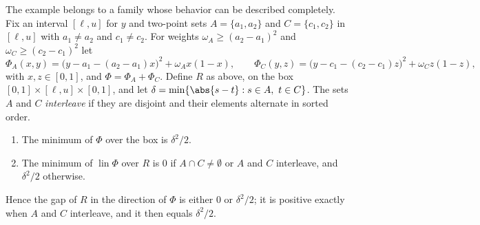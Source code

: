 The example belongs to a family whose behavior can be described
completely. Fix an interval $[\ell,u]$ for $y$ and two-point sets
$A=\{a_1,a_2\}$ and $C=\{c_1,c_2\}$ in $[\ell,u]$ with $a_1\ne a_2$ and
$c_1\ne c_2$. For weights $\omega_A\ge(a_2-a_1)^2$ and
$\omega_C\ge(c_2-c_1)^2$ let
\begin{equation}\label{eq:family}
\Phi_A(x,y)=\bigl(y-a_1-(a_2-a_1)x\bigr)^2+\omega_Ax(1-x),\qquad
\Phi_C(y,z)=\bigl(y-c_1-(c_2-c_1)z\bigr)^2+\omega_Cz(1-z),
\end{equation}
with $x,z\in[0,1]$, and $\Phi=\Phi_A+\Phi_C$. Define $R$ as above, on the
box $[0,1]\times[\ell,u]\times[0,1]$, and let
$\delta=\min\{\abs{s-t}:s\in A,\ t\in C\}$. The sets $A$ and $C$
\emph{interleave} if they are disjoint and their elements alternate in
sorted order.

\begin{theorem}[Interleaving]\label{thm:interleave}
\begin{enumerate}[label=(\roman*)]
\item The minimum of $\Phi$ over the box is $\delta^2/2$.
\item The minimum of $\operatorname{lin}\Phi$ over $R$ is $0$ if
$A\cap C\ne\emptyset$ or $A$ and $C$ interleave, and $\delta^2/2$ otherwise.
\end{enumerate}
Hence the gap of $R$ in the direction of $\Phi$ is either $0$ or
$\delta^2/2$; it is positive exactly when $A$ and $C$ interleave, and it
then equals $\delta^2/2$.
\end{theorem}

